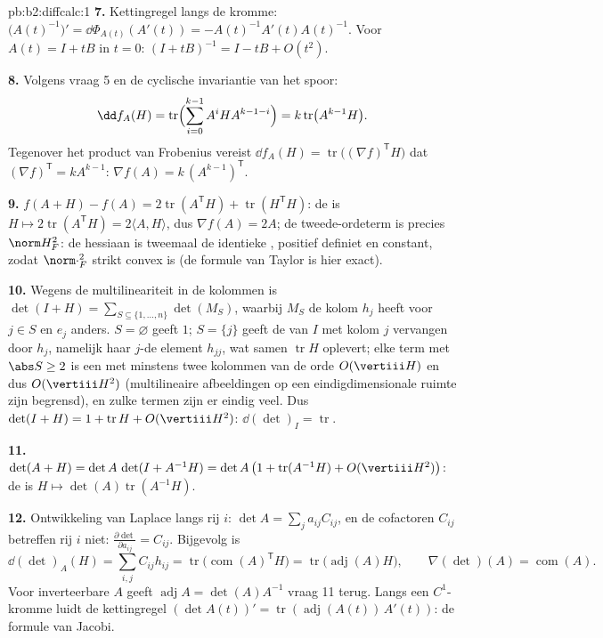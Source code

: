 \begin{solution}{pb:b2:diffcalc:1}
\textbf{7.} Kettingregel langs de kromme:
$\bigl(A(t)^{-1}\bigr)' = \dd\Phi_{A(t)}(A'(t)) =
-A(t)^{-1}A'(t)A(t)^{-1}$. Voor $A(t) = I + tB$ in $t = 0$: $(I +
tB)^{-1} = I - tB + O(t^2)$.

\textbf{8.} Volgens vraag 5 en de cyclische invariantie van het
spoor:
\[
\dd f_A(H) = \operatorname{tr}\Bigl(\sum_{i=0}^{k-1}
A^iHA^{k-1-i}\Bigr) = k\operatorname{tr}\bigl(A^{k-1}H\bigr) .
\]
Tegenover het product van Frobenius vereist $\dd f_A(H) =
\operatorname{tr}\bigl((\nabla f)^{\mathsf T}H\bigr)$ dat $(\nabla
f)^{\mathsf T} = kA^{k-1}$: $\nabla f(A) = k\,(A^{k-1})^{\mathsf
T}$.

\textbf{9.} $f(A + H) - f(A) = 2\operatorname{tr}(A^{\mathsf T}H) +
\operatorname{tr}(H^{\mathsf T}H)$: de  is $H \mapsto
2\operatorname{tr}(A^{\mathsf T}H) = 2\langle A, H\rangle$, dus
$\nabla f(A) = 2A$; de tweede-ordeterm is precies $\norm H_F^2$: de
hessiaan is tweemaal de identieke , positief
definiet en constant, zodat $\norm\cdot_F^2$ strikt convex is (de
formule van Taylor is hier exact).

\textbf{10.} Wegens de multilineariteit in de kolommen is $\det(I +
H) = \sum_{S\subseteq\{1,\dots,n\}}\det(M_S)$, waarbij $M_S$ de
kolom $h_j$ heeft voor $j \in S$ en $e_j$ anders. $S = \varnothing$
geeft $1$; $S = \{j\}$ geeft de  van $I$ met kolom $j$
vervangen door $h_j$, namelijk haar $j$-de element $h_{jj}$, wat
samen $\operatorname{tr}H$ oplevert; elke term met $\abs S \geq 2$
is een  met minstens twee kolommen van de orde
$O(\vertiii H)$ en dus $O(\vertiii H^2)$ (multilineaire
afbeeldingen op een eindigdimensionale ruimte zijn begrensd), en
zulke termen zijn er eindig veel. Dus $\det(I + H) = 1 +
\operatorname{tr}H + O(\vertiii H^2)$: $\dd(\det)_I =
\operatorname{tr}$.

\textbf{11.} $\det(A + H) = \det A\,\det(I + A^{-1}H) = \det
A\,\bigl(1 + \operatorname{tr}(A^{-1}H) + O(\vertiii H^2)\bigr)$:
de  is $H \mapsto \det(A)\operatorname{tr}(A^{-1}H)$.

\textbf{12.} Ontwikkeling van Laplace langs rij $i$: $\det A =
\sum_j a_{ij}C_{ij}$, en de cofactoren $C_{ij}$ betreffen rij $i$
niet: $\frac{\partial\det}{\partial a_{ij}} = C_{ij}$. Bijgevolg is
\[
\dd(\det)_A(H) = \sum_{i,j}C_{ij}h_{ij}
= \operatorname{tr}\bigl(\operatorname{com}(A)^{\mathsf T}
H\bigr)
= \operatorname{tr}\bigl(\operatorname{adj}(A)H\bigr),
\qquad
\nabla(\det)(A) = \operatorname{com}(A) .
\]
Voor inverteerbare $A$ geeft $\operatorname{adj}A =
\det(A)A^{-1}$ vraag 11 terug. Langs een $C^1$-kromme luidt de
kettingregel $(\det A(t))' =
\operatorname{tr}(\operatorname{adj}(A(t))\,A'(t))$: de formule van
Jacobi.


\end{solution}
